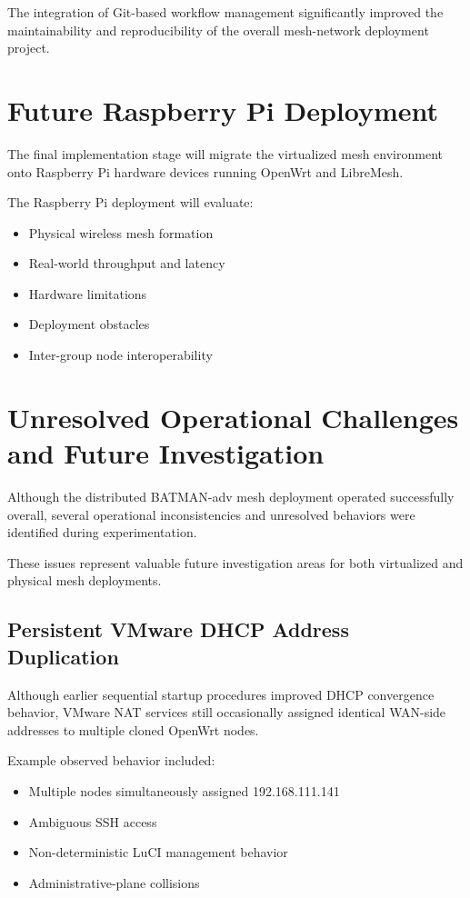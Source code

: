 \documentclass[conference]{IEEEtran}
\begin{document}
The integration of Git-based workflow management significantly improved the maintainability and reproducibility of the overall mesh-network deployment project.

\section{Future Raspberry Pi Deployment}

The final implementation stage will migrate the virtualized mesh environment onto Raspberry Pi hardware devices running OpenWrt and LibreMesh.

The Raspberry Pi deployment will evaluate:

\begin{itemize}
    \item Physical wireless mesh formation
    \item Real-world throughput and latency
    \item Hardware limitations
    \item Deployment obstacles
    \item Inter-group node interoperability
\end{itemize}

\section{Unresolved Operational Challenges and Future Investigation}

Although the distributed BATMAN-adv mesh deployment operated successfully overall, several operational inconsistencies and unresolved behaviors were identified during experimentation.

These issues represent valuable future investigation areas for both virtualized and physical mesh deployments.

\subsection{Persistent VMware DHCP Address Duplication}

Although earlier sequential startup procedures improved DHCP convergence behavior, VMware NAT services still occasionally assigned identical WAN-side addresses to multiple cloned OpenWrt nodes.

Example observed behavior included:

\begin{itemize}
    \item Multiple nodes simultaneously assigned 192.168.111.141
    \item Ambiguous SSH access
    \item Non-deterministic LuCI management behavior
    \item Administrative-plane collisions
\end{itemize}
\end{document}
